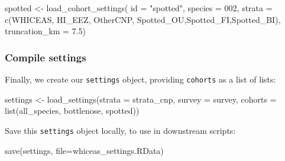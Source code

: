 \documentclass[
]{book}
\newenvironment{Shaded}{\begin{snugshade}}{\end{snugshade}}
\newcommand{\AttributeTok}[1]{\textcolor[rgb]{0.77,0.63,0.00}{#1}}
\newcommand{\FloatTok}[1]{\textcolor[rgb]{0.00,0.00,0.81}{#1}}
\newcommand{\FunctionTok}[1]{\textcolor[rgb]{0.00,0.00,0.00}{#1}}
\newcommand{\NormalTok}[1]{#1}
\newcommand{\OtherTok}[1]{\textcolor[rgb]{0.56,0.35,0.01}{#1}}
\newcommand{\StringTok}[1]{\textcolor[rgb]{0.31,0.60,0.02}{#1}}
\begin{document}
\begin{Shaded}
\begin{Highlighting}[]
\NormalTok{spotted }\OtherTok{\textless{}{-}} \FunctionTok{load\_cohort\_settings}\NormalTok{(}
  \AttributeTok{id =} \StringTok{"spotted"}\NormalTok{,}
  \AttributeTok{species =} \StringTok{\textquotesingle{}002\textquotesingle{}}\NormalTok{,}
  \AttributeTok{strata =} \FunctionTok{c}\NormalTok{(}\StringTok{\textquotesingle{}WHICEAS\textquotesingle{}}\NormalTok{, }\StringTok{\textquotesingle{}HI\_EEZ\textquotesingle{}}\NormalTok{, }\StringTok{\textquotesingle{}OtherCNP\textquotesingle{}}\NormalTok{,}
             \StringTok{\textquotesingle{}Spotted\_OU\textquotesingle{}}\NormalTok{,}\StringTok{\textquotesingle{}Spotted\_FI\textquotesingle{}}\NormalTok{,}\StringTok{\textquotesingle{}Spotted\_BI\textquotesingle{}}\NormalTok{),}
  \AttributeTok{truncation\_km =} \FloatTok{7.5}\NormalTok{)}
\end{Highlighting}
\end{Shaded}

\hypertarget{compile-settings}{%
\subsubsection*{Compile settings}\label{compile-settings}}

Finally, we create our \texttt{settings} object, providing \texttt{cohorts} as a list of lists:

\begin{Shaded}
\begin{Highlighting}[]
\NormalTok{settings }\OtherTok{\textless{}{-}} \FunctionTok{load\_settings}\NormalTok{(}\AttributeTok{strata =}\NormalTok{ strata\_cnp,}
                          \AttributeTok{survey =}\NormalTok{ survey,}
                          \AttributeTok{cohorts =} \FunctionTok{list}\NormalTok{(all\_species,}
\NormalTok{                                         bottlenose,}
\NormalTok{                                         spotted))}
\end{Highlighting}
\end{Shaded}

Save this \texttt{settings} object locally, to use in downstream scripts:

\begin{Shaded}
\begin{Highlighting}[]
\FunctionTok{save}\NormalTok{(settings, }\AttributeTok{file=}\StringTok{\textquotesingle{}whiceas\_settings.RData\textquotesingle{}}\NormalTok{)}
\end{Highlighting}
\end{Shaded}
\end{document}

